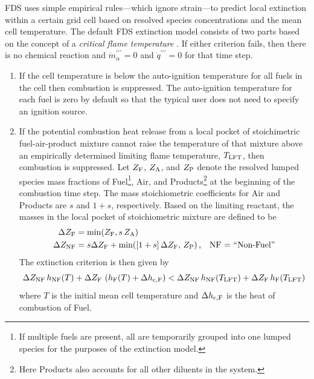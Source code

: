 FDS uses simple empirical rules---which ignore strain---to predict local extinction within a certain grid cell based on resolved species concentrations and the mean cell temperature.  The default FDS extinction model consists of two parts based on the concept of a \emph{critical flame temperature} \cite{SFPE:Beyler}. If either criterion fails, then there is no chemical reaction and $\dot{m}_\alpha^{\prime\prime\prime}=0$ and $\dot{q}^{\prime\prime\prime}=0$ for that time step.

\begin{enumerate}
\item If the cell temperature is below the auto-ignition temperature for all fuels in the cell then combustion is suppressed. The auto-ignition temperature for each fuel is zero by default so that the typical user does not need to specify an ignition source.
\item If the potential combustion heat release from a local pocket of stoichimetric fuel-air-product mixture cannot raise the temperature of that mixture above an empirically determined limiting flame temperature, $T_{\rm LFT}$, then combustion is suppressed.  Let $Z_{\rm F}$, $Z_{\rm A}$, and $Z_{\rm P}$ denote the resolved lumped species mass fractions of Fuel\footnote{If multiple fuels are present, all are temporarily grouped into one lumped species for the purposes of the extinction model.}, Air, and Products\footnote{Here Products also accounts for all other diluents in the system.} at the beginning of the combustion time step.  The mass stoichiometric coefficients for Air and Products are $s$ and $1+s$, respectively.  Based on the limiting reactant, the masses in the local pocket of stoichiometric mixture are defined to be
\begin{align}
\label{eq:dzf}  \Delta Z_{\rm F} &= \min(Z_{\rm F},s\,Z_{\rm A})                 \\
\label{eq:dznf} \Delta Z_{\rm NF} &= s \Delta Z_{\rm F} + \min([1+s]\,\Delta Z_{\rm F},\, Z_{\rm P})\,\mbox{,} \quad \mbox{NF = ``Non-Fuel''}
\end{align}
The extinction criterion is then given by
\begin{equation}
\label{eq:extinction}
\Delta Z_{\rm NF} \, h_{\rm NF}(T) + \Delta Z_{\rm F}  \, \left( h_{\rm F}(T)+\Delta h_{\rm c,F} \right) <
\Delta Z_{\rm NF} \, h_{\rm NF}(T_{\rm LFT}) + \Delta Z_{\rm F}  \, h_{\rm F}(T_{\rm LFT})
\end{equation}
where $T$ is the initial mean cell temperature and $\Delta h_{\rm c,F}$ is the heat of combustion of Fuel.
\end{enumerate}

